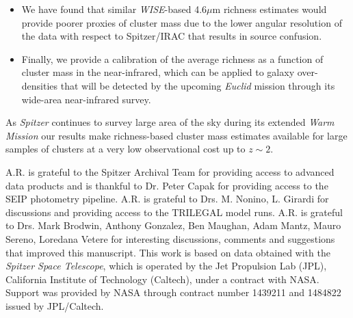 \documentclass[apj,twocolumn]{emulateapj}
\begin{document}
{\begin{itemize}
\item{} We have found that similar {\it WISE}-based 4.6$\mu$m richness estimates would provide poorer proxies of cluster mass due to the lower angular resolution of the data with respect to Spitzer/IRAC that results in source confusion.
\end{itemize}

\begin{itemize}
\item{} Finally, we provide a calibration of the average richness as a function of cluster mass in the near-infrared, which can be applied to galaxy over-densities that will be detected by the upcoming {\it Euclid} mission through its wide-area near-infrared survey.
\end{itemize}

As {\it Spitzer} continues to survey large area of the sky during its extended {\it Warm Mission} our results make richness-based cluster mass estimates available for large samples of clusters at a very low observational cost up to $z \sim 2$. 

\acknowledgments  A.R.  is  grateful to the Spitzer Archival Team for providing access to advanced data products and is thankful to Dr. Peter Capak for providing access to the SEIP photometry pipeline. A.R. is grateful to Drs. M. Nonino, L. Girardi for discussions and providing access to the TRILEGAL model runs. A.R.  is  grateful to Drs. Mark Brodwin, Anthony Gonzalez,  Ben Maughan, Adam Mantz, Mauro Sereno, Loredana Vetere for interesting discussions, comments and suggestions that improved this manuscript. This work is based on data obtained with the {\it Spitzer Space Telescope}, which is operated by the Jet Propulsion Lab (JPL), California Institute of Technology (Caltech), under a contract with NASA. Support was provided by NASA through contract number 1439211 and 1484822 issued by JPL/Caltech.  

\clearpage

}
\end{document}
